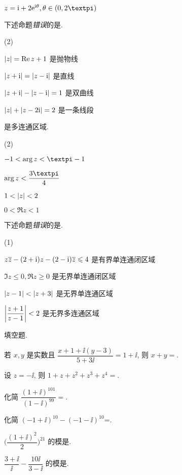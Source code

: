 \begin{homework}
\begin{homework}
\begin{exchoice}
      \item $z=\ii+2\ee^{\ii\theta},\theta\in(0,2\cpi)$
    \end{exchoice}
    \item 下述命题\emph{错误}的是\fillbrace{}.
    \begin{exchoice}(2)
      \item $\lvert z\rvert=\operatorname{Re} z+1$ 是抛物线
      \item $\lvert z+\mathrm{i}\rvert=\lvert z-\mathrm{i}\rvert$ 是直线
      \item $\lvert z+\mathrm{i}\rvert-\lvert z-\mathrm{i}\rvert=1$ 是双曲线
      \item $\lvert z\rvert+\lvert z-2\mathrm{i}\rvert=2$ 是一条线段
    \end{exchoice}
    \item \fillbrace{}是多连通区域.
    \begin{exchoice}(2)
      \item $-1<\arg z<\cpi-1$
      \item $\arg z<\dfrac{3\cpi}4$
      \item $1<\lvert z\rvert<2$
      \item $0<\Re z<1$
    \end{exchoice}
    \item 下述命题\emph{错误}的是\fillbrace{}.
    \begin{exchoice}(1)
      \item $z\overline z-(2+\mathrm{i})z-(2-\mathrm{i})\overline z\leqslant 4$ 是有界单连通闭区域
      \item $\Im z\le0,\Re z\ge0$ 是无界单连通闭区域
      \item $\lvert z-1\rvert<\lvert z+3\rvert$ 是无界单连通区域
      \item $\biggl\vert\dfrac{z+1}{z-1}\biggr\vert<2$ 是无界多连通区域
    \end{exchoice}
  \end{homework}
  \item 填空题.
  \begin{homework}
    \item 若 $x,y$ 是实数且 $\dfrac{x+1+\ii(y-3)}{5+3\ii}=1+\ii$, 则 $x+y=$\fillblank{}.
    \item 设 $z=-\ii$, 则 $1+z+z^2+z^3+z^4=$\fillblank{}.
    \item 化简 $\dfrac{(1+\ii)^{101}}{(1-\ii)^{99}}=$\fillblank{}.
    \item 化简 $(-1+\ii)^{10}-(-1-\ii)^{10}$=\fillblank{}.
    \item $\biggl(\dfrac{(1+\ii)^2}2\biggr)^{21}$ 的模是\fillblank{}.
    \item $\dfrac{3+\ii}{\ii}-\dfrac{10\ii}{3-\ii}$ 的模是\fillblank{}.

\end{homework}
\end{homework}
